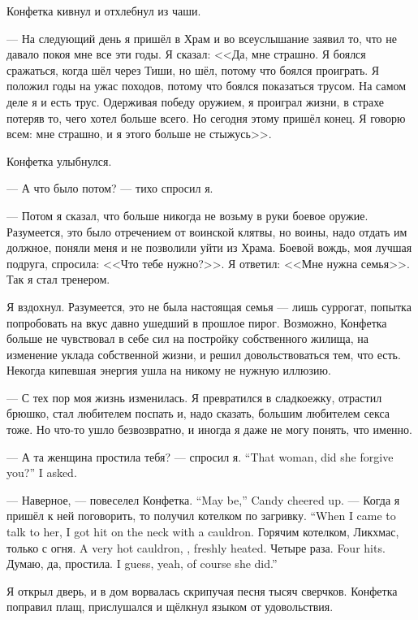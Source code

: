 Конфетка кивнул и отхлебнул из чаши.

--- На следующий день я пришёл в Храм и во всеуслышание заявил то, что не давало покоя мне все эти годы.
Я сказал: <<Да, мне страшно.
Я боялся сражаться, когда шёл через Тиши, но шёл, потому что боялся проиграть.
Я положил годы на ужас походов, потому что боялся показаться трусом.
На самом деле я и есть трус.
Одерживая победу оружием, я проиграл жизни, в страхе потеряв то, чего хотел больше всего.
Но сегодня этому пришёл конец.
Я говорю всем: мне страшно, и я этого больше не стыжусь>>.

Конфетка улыбнулся.

--- А что было потом? --- тихо спросил я.

--- Потом я сказал, что больше никогда не возьму в руки боевое оружие.
Разумеется, это было отречением от воинской клятвы, но воины, надо отдать им должное, поняли меня и не позволили уйти из Храма.
Боевой вождь, моя лучшая подруга, спросила: <<Что тебе нужно?>>.
Я ответил: <<Мне нужна семья>>.
Так я стал тренером.

Я вздохнул.
Разумеется, это не была настоящая семья --- лишь суррогат, попытка попробовать на вкус давно ушедший в прошлое пирог.
Возможно, Конфетка больше не чувствовал в себе сил на постройку собственного жилища, на изменение уклада собственной жизни, и решил довольствоваться тем, что есть. Некогда кипевшая энергия ушла на никому не нужную иллюзию.

--- С тех пор моя жизнь изменилась.
Я превратился в сладкоежку, отрастил брюшко, стал любителем поспать и, надо сказать, большим любителем секса тоже.
Но что-то ушло безвозвратно, и иногда я даже не могу понять, что именно.

{--- А та женщина простила тебя? --- спросил я.}
{``That woman, did she forgive you?'' I asked.}

{--- Наверное, --- повеселел Конфетка.}
{``May be,'' Candy cheered up.}
{--- Когда я пришёл к ней поговорить, то получил котелком по загривку.}
{``When I came to talk to her, I got hit on the neck with a cauldron.}
{Горячим котелком, Ликхмас, только с огня.}
{A very hot cauldron, \Likchmas, freshly heated.}
{Четыре раза.}
{Four hits.}
{Думаю, да, простила.}
{I guess, yeah, of course she did.''}

\asterism

Я открыл дверь, и в дом ворвалась скрипучая песня тысяч сверчков.
Конфетка поправил плащ, прислушался и щёлкнул языком от удовольствия.

